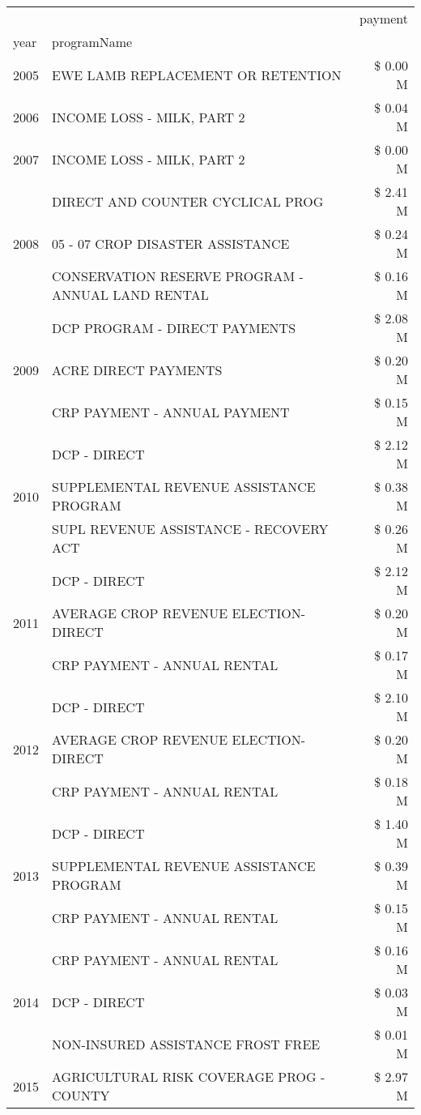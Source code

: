 \begin{tabular}{llr}
\toprule
 &  & payment \\
year & programName &  \\
\midrule
2005 & EWE LAMB REPLACEMENT OR RETENTION & \$ 0.00 M \\
\cline{1-3}
2006 & INCOME LOSS - MILK, PART 2 & \$ 0.04 M \\
\cline{1-3}
2007 & INCOME LOSS - MILK, PART 2 & \$ 0.00 M \\
\cline{1-3}
\multirow[t]{3}{*}{2008} & DIRECT AND COUNTER CYCLICAL PROG & \$ 2.41 M \\
 & 05 - 07 CROP DISASTER ASSISTANCE & \$ 0.24 M \\
 & CONSERVATION RESERVE PROGRAM - ANNUAL LAND RENTAL & \$ 0.16 M \\
\cline{1-3}
\multirow[t]{3}{*}{2009} & DCP PROGRAM - DIRECT PAYMENTS & \$ 2.08 M \\
 & ACRE DIRECT PAYMENTS & \$ 0.20 M \\
 & CRP PAYMENT - ANNUAL PAYMENT & \$ 0.15 M \\
\cline{1-3}
\multirow[t]{3}{*}{2010} & DCP - DIRECT & \$ 2.12 M \\
 & SUPPLEMENTAL REVENUE ASSISTANCE PROGRAM & \$ 0.38 M \\
 & SUPL REVENUE ASSISTANCE - RECOVERY ACT & \$ 0.26 M \\
\cline{1-3}
\multirow[t]{3}{*}{2011} & DCP - DIRECT & \$ 2.12 M \\
 & AVERAGE CROP REVENUE ELECTION-DIRECT & \$ 0.20 M \\
 & CRP PAYMENT - ANNUAL RENTAL & \$ 0.17 M \\
\cline{1-3}
\multirow[t]{3}{*}{2012} & DCP - DIRECT & \$ 2.10 M \\
 & AVERAGE CROP REVENUE ELECTION-DIRECT & \$ 0.20 M \\
 & CRP PAYMENT - ANNUAL RENTAL & \$ 0.18 M \\
\cline{1-3}
\multirow[t]{3}{*}{2013} & DCP - DIRECT & \$ 1.40 M \\
 & SUPPLEMENTAL REVENUE ASSISTANCE PROGRAM & \$ 0.39 M \\
 & CRP PAYMENT - ANNUAL RENTAL & \$ 0.15 M \\
\cline{1-3}
\multirow[t]{3}{*}{2014} & CRP PAYMENT - ANNUAL RENTAL & \$ 0.16 M \\
 & DCP - DIRECT & \$ 0.03 M \\
 & NON-INSURED ASSISTANCE FROST FREE & \$ 0.01 M \\
\cline{1-3}
\multirow[t]{3}{*}{2015} & AGRICULTURAL RISK COVERAGE PROG - COUNTY & \$ 2.97 M \\

\end{tabular}
